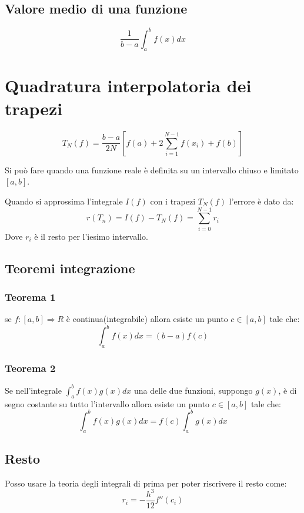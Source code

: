 \subsection{Valore medio di una funzione}
\begin{equation*}
  \frac{1}{b-a}\int_a^b f(x)dx
\end{equation*}

\section{Quadratura interpolatoria dei trapezi}
\begin{equation}
  T_N(f) = \frac{b-a}{2N}[f(a)+ 2\sum_{i=1}^{N-1}f(x_i) + f(b)] 
\end{equation}

Si può fare quando una funzione reale è definita su un intervallo chiuso e limitato $[a, b]$.

Quando si approssima l'integrale $I(f)$ con i trapezi $T_N(f)$ l'errore è dato da:
\begin{equation}
  r(T_n) = I(f) - T_N(f) = \sum_{i=0}^{N-1}r_i
\end{equation}
Dove $r_i$ è il resto per l'iesimo intervallo.

\subsection{Teoremi integrazione}
\subsubsection{Teorema 1}
se $f: [a, b]  \Rightarrow R$ è continua(integrabile) allora esiste un punto $c \in [a, b]$ tale che:
\begin{equation*}
  \int_a^b f(x)dx = (b-a)f(c)
\end{equation*}

\subsubsection{Teorema 2}
Se nell'integrale $\int_a^b f(x)g(x)dx$ una delle due funzioni, suppongo $g(x)$, è di segno
costante su tutto l'intervallo allora esiste un punto $c \in [a, b]$ tale che:
\begin{equation*}
  \int_a^b f(x)g(x)dx = f(c)\int_a^b g(x)dx
\end{equation*}


\subsection{Resto}
Posso usare la teoria degli integrali di prima per poter riscrivere il resto come:
\begin{equation}
  r_i = -\frac{h^3}{12}f''(c_i)
\end{equation}

